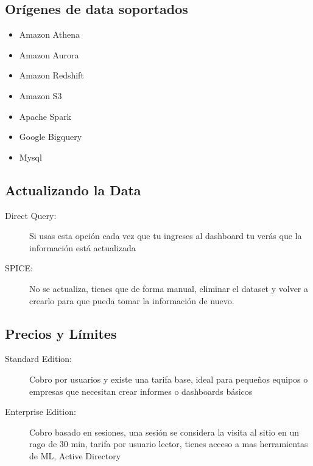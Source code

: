 \subsection{Orígenes de data soportados}
\begin{itemize}
	\item Amazon Athena
	\item Amazon Aurora
	\item Amazon Redshift
	\item Amazon S3
	\item Apache Spark
	\item Google Bigquery
	\item Mysql
\end{itemize}

\subsection{Actualizando la Data}
\begin{description}
	\item[Direct Query:] Si usas esta opción cada vez que tu ingreses al dashboard tu verás que la información está actualizada
	\item[SPICE:] No se actualiza, tienes que de forma manual, eliminar el dataset y volver a crearlo para que pueda tomar la información de nuevo.
\end{description}

\subsection{Precios y Límites}
\begin{description}
	\item[Standard Edition:] Cobro por usuarios y existe una tarifa base, ideal para pequeños equipos o empresas que necesitan crear informes o dashboards básicos
	\item[Enterprise Edition:] Cobro basado en sesiones, una sesión se considera la visita al sitio en un rago de 30 min, tarifa por usuario lector, tienes acceso a mas herramientas de ML, Active Directory
\end{description}
